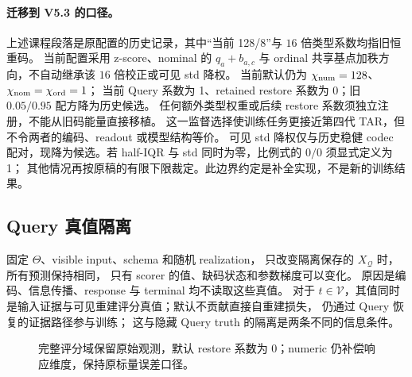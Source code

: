 \documentclass[11pt,UTF8,fontset=fandol]{ctexart}
\numberwithin{equation}{section}
\theoremstyle{definition}
\newcommand{\Vset}{\mathcal V}
\newcommand{\Qset}{\mathcal Q}
\begin{document}
\paragraph{迁移到 V5.3 的口径。}
上述课程段落是原配置的历史记录，其中“当前 128/8”与 $16$ 倍类型系数均指旧恒重码。
当前配置采用 z-score、nominal 的 $q_a+b_{a,c}$ 与 ordinal 共享基点加秩方向，不自动继承该 $16$ 倍校正或可见 std 降权。
当前默认仍为 $\chi_{\rm num}=128$、$\chi_{\rm nom}=\chi_{\rm ord}=1$；
当前 Query 系数为 1、retained restore 系数为 0；旧 $0.05/0.95$ 配方降为历史候选。
任何额外类型权重或后续 restore 系数须独立注册，不能从旧码能量直接移植。
这一监督选择使训练任务更接近第四代 TAR，但不令两者的编码、readout 或模型结构等价。
可见 std 降权仅与历史稳健 codec 配对，现降为候选。若 half-IQR 与 std 同时为零，比例式的 $0/0$ 须显式定义为 1；
其他情况再按原稿的有限下限裁定。此边界约定是补全实现，不是新的训练结果。
\subsection{Query 真值隔离}
固定 $\Theta$、visible input、schema 和随机 realization，
只改变隔离保存的 $X_{\Qset}$ 时，所有预测保持相同，
只有 scorer 的值、缺码状态和参数梯度可以变化。
原因是编码、信息传播、response 与 terminal 均不读取这些真值。
对于 $t\in\Vset$，其值同时是输入证据与可见重建评分真值；默认不贡献直接自重建损失，
仍通过 Query 恢复的证据路径参与训练；
这与隐藏 Query truth 的隔离是两条不同的信息条件。


\begin{figure}[htbp]\centering
{}
\caption{完整评分域保留原始观测，默认 restore 系数为 0；numeric 仍补偿响应维度，保持原标量误差口径。}
\label{fig:loss}\end{figure}
\end{document}
